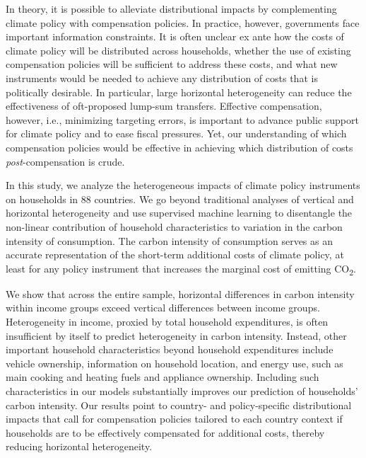 \documentclass[12pt, a4paper]{article}
\begin{document}
In theory, it is possible to alleviate distributional impacts by complementing climate policy with compensation policies. In practice, however, governments face important information constraints. It is often unclear ex ante how the costs of climate policy will be distributed across households, whether the use of existing compensation policies will be sufficient to address these costs, and what new instruments would be needed to achieve any distribution of costs that is politically desirable. In particular, large horizontal heterogeneity can reduce the effectiveness of oft-proposed lump-sum transfers. Effective compensation, however, i.e., minimizing targeting errors, is important to advance public support for climate policy and to ease fiscal pressures. Yet, our understanding of which compensation policies would be effective in achieving which distribution of costs \textit{post}-compensation is crude.

In this study, we analyze the heterogeneous impacts of climate policy instruments on households in 88 countries. We go beyond traditional analyses of vertical and horizontal heterogeneity and use supervised machine learning to disentangle the non-linear contribution of household characteristics to variation in the carbon intensity of consumption. The carbon intensity of consumption serves as an accurate representation of the short-term additional costs of climate policy, at least for any policy instrument that increases the marginal cost of emitting CO\textsubscript{2}.

We show that across the entire sample, horizontal differences in carbon intensity within income groups exceed vertical differences between income groups. Heterogeneity in income, proxied by total household expenditures, is often insufficient by itself to predict heterogeneity in carbon intensity. Instead, other important household characteristics beyond household expenditures include vehicle ownership, information on household location, and energy use, such as main cooking and heating fuels and appliance ownership. Including such characteristics in our models substantially improves our prediction of households' carbon intensity. Our results point to country- and policy-specific distributional impacts that call for compensation policies tailored to each country context if households are to be effectively compensated for additional costs, thereby reducing horizontal heterogeneity. 
\end{document}

